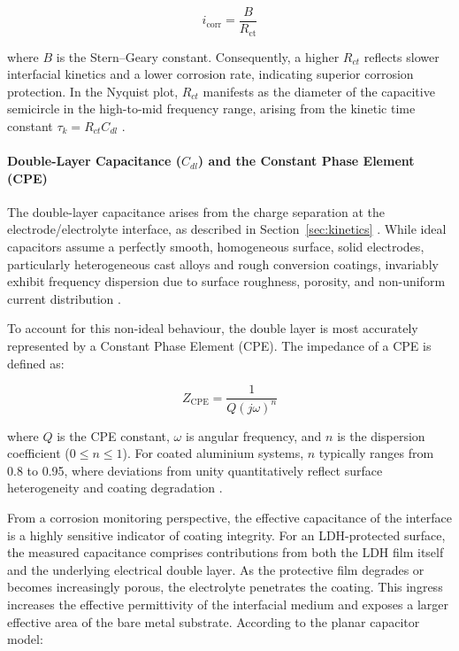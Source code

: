 \documentclass[11pt,twoside,a4paper,final]{report}
\begin{document}
\begin{equation}
    i_{\text{corr}} = \frac{B}{R_{\text{ct}}} \label{eq:icorr}
\end{equation}

where $B$ is the Stern--Geary constant. Consequently, a higher $R_{ct}$ reflects slower interfacial kinetics and a lower corrosion rate, indicating superior corrosion protection. In the Nyquist plot, $R_{ct}$ manifests as the diameter of the capacitive semicircle in the high-to-mid frequency range, arising from the kinetic time constant $\tau_{k} = R_{ct} C_{dl}$ \cite{Das2025, Lasia2014}.

\paragraph{Double-Layer Capacitance ($C_{dl}$) and the Constant Phase Element (CPE)}
The double-layer capacitance arises from the charge separation at the electrode/electrolyte interface, as described in Section~\ref{sec:kinetics} \cite{Kelly2002, MetrohmEIS3}. While ideal capacitors assume a perfectly smooth, homogeneous surface, solid electrodes, particularly heterogeneous cast alloys and rough conversion coatings, invariably exhibit frequency dispersion due to surface roughness, porosity, and non-uniform current distribution \cite{Lasia2014, Das2025}. 

To account for this non-ideal behaviour, the double layer is most accurately represented by a Constant Phase Element (CPE). The impedance of a CPE is defined as:

\begin{equation}
    Z_{\text{CPE}} = \frac{1}{Q(j\omega)^n} \label{eq:cpe}
\end{equation}

where $Q$ is the CPE constant, $\omega$ is angular frequency, and $n$ is the dispersion coefficient ($0 \le n \le 1$). For coated aluminium systems, $n$ typically ranges from 0.8 to 0.95, where deviations from unity quantitatively reflect surface heterogeneity and coating degradation \cite{Lasia2014, Das2025}.

From a corrosion monitoring perspective, the effective capacitance of the interface is a highly sensitive indicator of coating integrity. For an LDH-protected surface, the measured capacitance comprises contributions from both the LDH film itself and the underlying electrical double layer. As the protective film degrades or becomes increasingly porous, the electrolyte penetrates the coating. This ingress increases the effective permittivity of the interfacial medium and exposes a larger effective area of the bare metal substrate. According to the planar capacitor model:
\end{document}
